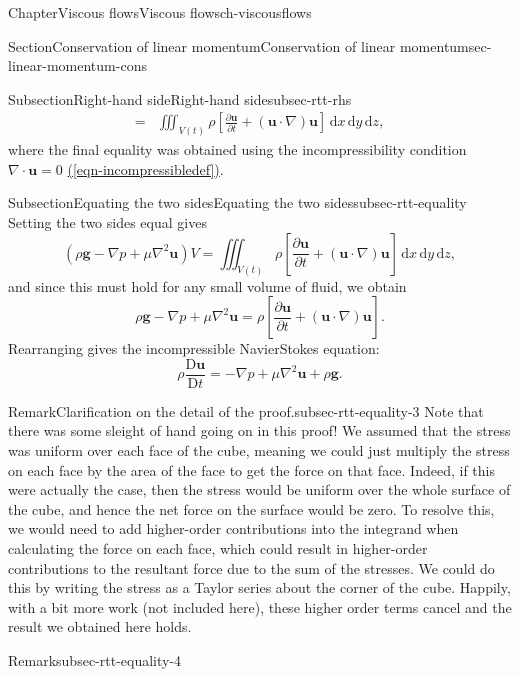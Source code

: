 \documentclass[oneside,10pt,]{book}
\newcommand{\xreffont}{\relax}
\numberwithin{equation}{section}
\newcommand{\de}{\mathrm{d}}
\newcommand{\DD}[2]{\frac{\mathrm{D}#1}{\mathrm{D}#2}}
\newcommand{\pd}[2]{\frac{\partial#1}{\partial#2}}
\newcommand{\bu}{\boldsymbol{u}}
\newcommand{\bg}{\boldsymbol{g}}
\begin{document}
\begin{chapterptx}{Chapter}{Viscous flows}{}{Viscous flows}{}{}{ch-viscousflows}
\begin{sectionptx}{Section}{Conservation of linear momentum}{}{Conservation of linear momentum}{}{}{sec-linear-momentum-cons}
\begin{subsectionptx}{Subsection}{Right-hand side}{}{Right-hand side}{}{}{subsec-rtt-rhs}
\begin{align*}
=& \iiint_{V(t)} \rho\left[ \pd{\bu}{t} + (\bu\cdot\nabla)\bu\right] \, \de{x} \, \de{y} \, \de{z},
\end{align*}
where the final equality was obtained using the incompressibility condition \(\nabla\cdot\bu=0\) \hyperref[eqn-incompressibledef]{({\xreffont\ref{eqn-incompressibledef}})}.%
\end{subsectionptx}
%
%
\typeout{************************************************}
\typeout{************************************************}
%
\begin{subsectionptx}{Subsection}{Equating the two sides}{}{Equating the two sides}{}{}{subsec-rtt-equality}
Setting the two sides equal gives%
\begin{equation*}
\left(\rho\bg-\nabla p + \mu\nabla^2\bu\right)V=\iiint_{V(t)} \rho\left[ \pd{\bu}{t} + (\bu\cdot\nabla)\bu\right] \, \de{x} \, \de{y} \, \de{z},
\end{equation*}
and since this must hold for any small volume of fluid, we obtain%
\begin{equation*}
\rho\bg-\nabla p + \mu\nabla^2\bu=\rho\left[ \pd{\bu}{t} + (\bu\cdot\nabla)\bu\right].
\end{equation*}
Rearranging gives the incompressible Navier\textendash{}Stokes equation:%
\begin{equation}
\boxed{\rho\DD{\bu}{t}
=-\nabla p+\mu\nabla^2\bu+\rho{\bg}.}\label{eqn-navierstokes}
\end{equation}
%
\begin{remark}{Remark}{Clarification on the detail of the proof.}{subsec-rtt-equality-3}%
Note that there was some sleight of hand going on in this proof! We assumed that the stress was uniform over each face of the cube, meaning we could just multiply the stress on each face by the area of the face to get the force on that face. Indeed, if this were actually the case, then the stress would be uniform over the whole surface of the cube, and hence the net force on the surface would be zero. To resolve this, we would need to add higher-order contributions into the integrand when calculating the force on each face, which could result in higher-order contributions to the resultant force due to the sum of the stresses. We could do this by writing the stress as a Taylor series about the corner of the cube. Happily, with a bit more work (not included here), these higher order terms cancel and the result we obtained here holds.%
\end{remark}
\begin{remark}{Remark}{}{subsec-rtt-equality-4}%

\end{remark}
\end{subsectionptx}
\end{sectionptx}
\end{chapterptx}
\end{document}
